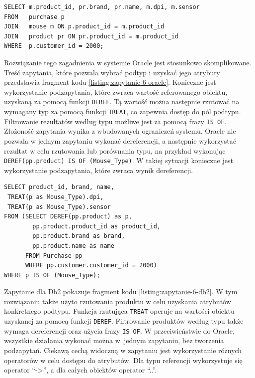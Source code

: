 \documentclass[a4paper,twoside,12pt]{book}
\begin{document}
\begin{lstlisting}[style=SQL, caption={Zapytanie szóste w podejściu relacyjnym.}, label={listing:zapytanie-6-rel}, captionpos=b]
SELECT m.product_id, pr.brand, pr.name, m.dpi, m.sensor
FROM   purchase p
JOIN   mouse m ON p.product_id = m.product_id
JOIN   product pr ON pr.product_id = m.product_id
WHERE  p.customer_id = 2000;
\end{lstlisting}

Rozwiązanie tego zagadnienia w systemie Oracle jest stosunkowo skomplikowane. Treść zapytania, które pozwala wybrać podtyp i uzyskać jego atrybuty przedstawia fragment kodu \ref{listing:zapytanie-6-oracle}. Konieczne jest wykorzystanie podzapytania, które zwraca wartość referowanego obiektu, uzyskaną za pomocą funkcji \lstinline{DEREF}. Tą wartość można następnie rzutować na wymagany typ za pomocą funkcji \lstinline{TREAT}, co zapewnia dostęp do pól podtypu. Filtrowanie rezultatów według typu możliwe jest za pomocą frazy \lstinline{IS OF}. Złożoność zapytania wynika z wbudowanych ograniczeń systemu. Oracle nie pozwala w jednym zapytaniu wykonać dereferencji, a następnie wykorzystać rezultat w celu rzutowania lub porównania typu, na przykład wykonując \lstinline{DEREF(pp.product) IS OF (Mouse_Type)}. W takiej sytuacji konieczne jest wykorzystanie podzapytania, które zwraca wynik dereferencji.

\begin{lstlisting}[style=SQL, caption={Zapytanie szóste w Oracle.}, label={listing:zapytanie-6-oracle}, captionpos=b]
SELECT product_id, brand, name, 
 TREAT(p as Mouse_Type).dpi, 
 TREAT(p as Mouse_Type).sensor 
FROM (SELECT DEREF(pp.product) as p, 
        pp.product.product_id as product_id, 
        pp.product.brand as brand, 
        pp.product.name as name
      FROM Purchase pp
      WHERE pp.customer.customer_id = 2000) 
WHERE p IS OF (Mouse_Type);
\end{lstlisting}

\vspace{0.15cm}

Zapytanie dla Db2 pokazuje fragment kodu \ref{listing:zapytanie-6-db2}. W tym rozwiązaniu także użyto rzutowania produktu w celu uzyskania atrybutów konkretnego podtypu. Funkcja rzutująca \lstinline{TREAT} operuje na wartości obiektu uzyskanej za pomocą funkcji \lstinline{DEREF}. Filtrowanie produktów według typu także wymaga dereferencji oraz użycia frazy \lstinline{IS OF}. W przeciwieństwie do Oracle, wszystkie działania wykonać można w~jednym zapytaniu, bez tworzenia podzapytań. Ciekawą cechą widoczną w zapytaniu jest wykorzystanie różnych operatorów w celu dostępu do atrybutów. Dla typu referencji wykorzystuje się operator ``->'', a dla całych obiektów operator ``..''.
\end{document}
